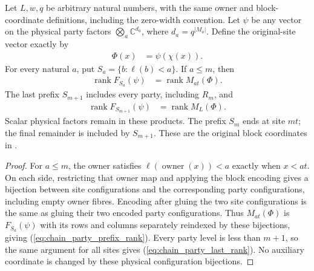\begin{lemma}
    \label{thm:chain_party_prefix_site_coordinates}
    \leanok
    Let $L,w,q$ be arbitrary natural numbers, with the same owner and
    block-coordinate definitions, including the zero-width convention.
    Let $\psi$ be any vector on the physical party factors
    $\bigotimes_a\mathbb C^{d_a}$, where $d_a=q^{|M_a|}$.
    Define the original-site vector exactly by
    \begin{align}
        \Phi(x) & =\psi(\chi(x)).
        \label{eq:chain_party_vector_pullback}
    \end{align}
    For every natural $a$, put $S_a=\{b:\ell(b)<a\}$. If $a\le m$, then
    \begin{align}
        \operatorname{rank}F_{S_a}(\psi)
         & =\operatorname{rank}M_{at}(\Phi).
        \label{eq:chain_party_prefix_rank}
    \end{align}
    The last prefix $S_{m+1}$ includes every party, including $R_m$, and
    \begin{align}
        \operatorname{rank}F_{S_{m+1}}(\psi)
         & =\operatorname{rank}M_L(\Phi).
        \label{eq:chain_party_last_rank}
    \end{align}
    Scalar physical factors remain in these products. The prefix $S_m$
    ends at site $mt$; the final remainder is included by $S_{m+1}$.
    These are the original block coordinates in
    \cite[Part~II, proof of Theorem~B]{TNLean2026OneDimensional}.
\end{lemma}
\begin{proof}\leanok
    For $a\le m$, the owner satisfies
    $\ell(\operatorname{owner}(x))<a$ exactly when $x<at$.
    On each side, restricting that owner map and applying the
    block encoding gives a bijection between site configurations and
    the corresponding party configurations, including empty owner fibres.
    Encoding after gluing the two site configurations is the same as
    gluing their two encoded party configurations. Thus $M_{at}(\Phi)$
    is $F_{S_a}(\psi)$ with its rows and columns separately reindexed
    by these bijections, giving (\ref{eq:chain_party_prefix_rank}).
    Every party level is less than $m+1$, so the same argument for all
    sites gives (\ref{eq:chain_party_last_rank}). No auxiliary coordinate
    is changed by these physical configuration bijections.
\end{proof}

